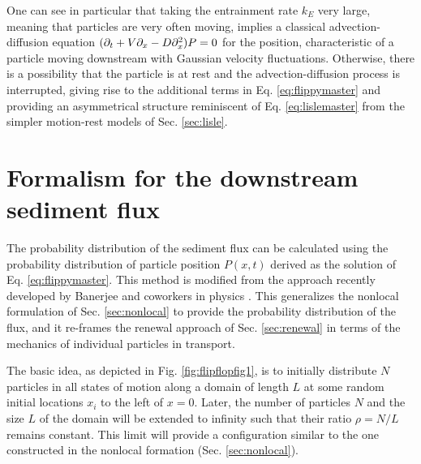 One can see in particular that taking the entrainment rate $k_E$ very large, meaning that particles are very often moving, implies a classical advection-diffusion equation $(\partial_t + V\partial_x -D \partial_x^2)P=0$ for the position, characteristic of a particle moving downstream with Gaussian velocity fluctuations. Otherwise, there is a possibility that the particle is at rest and the advection-diffusion process is interrupted, giving rise to the additional terms in Eq. \ref{eq:flippymaster} and providing an asymmetrical structure reminiscent of Eq. \ref{eq:lislemaster} from the simpler motion-rest models of Sec. \ref{sec:lisle}.

\section{Formalism for the downstream sediment flux}
\label{sec:flippyflux}

The probability distribution of the sediment flux can be calculated using the probability distribution of particle position $P(x,t)$ derived as the solution of Eq. \ref{eq:flippymaster}.
This method is modified from the approach recently developed by Banerjee and coworkers in physics \citep{Banerjee2020}.
This generalizes the nonlocal formulation of Sec. \ref{sec:nonlocal} to provide the probability distribution of the flux, and it re-frames the renewal approach of Sec. \ref{sec:renewal} in terms of the mechanics of individual particles in transport.

The basic idea, as depicted in Fig. \ref{fig:flipflopfig1}, is to initially distribute $N$ particles in all states of motion along a domain of length $L$ at some random initial locations $x_i$ to the left of $x=0$.
Later, the number of particles $N$ and the size $L$ of the domain will be extended to infinity such that their ratio $\rho=N/L$ remains constant. 
This limit will provide a configuration similar to the one constructed in the nonlocal formation (Sec. \ref{sec:nonlocal}).

